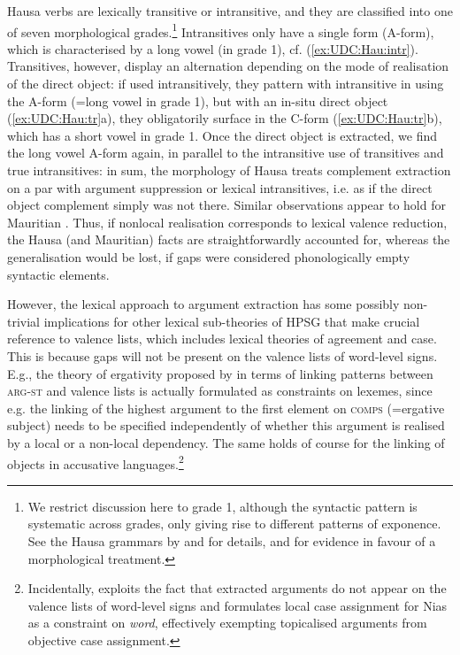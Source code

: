 \documentclass[output=paper
                ,modfonts
                ,nonflat
	        ,collection
	        ,collectionchapter
	        ,collectiontoclongg
 	        ,biblatex
                ,babelshorthands
                ,newtxmath
                ,draftmode
                ,colorlinks, citecolor=brown
]{./langsci/langscibook}
\begin{document}
{\begin{exe}
\end{exe}

\noindent
Hausa verbs are lexically transitive or intransitive, and they are
classified into one of seven morphological grades.\footnote{We
  restrict discussion here to grade 1, although the syntactic pattern
  is systematic across grades, only giving rise to different patterns
  of exponence. See the Hausa grammars by \citet{newman_p00} and
  \citet{jaggar01:_hausa} for details, and \citet{crysmann_b04yom} for
  evidence in favour of a morphological treatment. } Intransitives
only have a single form (A-form), which is characterised by a long
vowel (in grade 1), cf. (\ref{ex:UDC:Hau:intr}). Transitives, however,
display an alternation depending on the mode of realisation of the
direct object: if used intransitively, they pattern with intransitive
in using the A-form (=long vowel in grade 1), but with an in-situ
direct object (\ref{ex:UDC:Hau:tr}a), they obligatorily surface in the
C-form (\ref{ex:UDC:Hau:tr}b), which has a short vowel in grade
1. Once the direct object is extracted, we find the long vowel A-form
again, in parallel to the intransitive use of transitives and true
intransitives: in sum, the morphology of Hausa treats complement
extraction on a par with argument suppression or lexical
intransitives, i.e. as if the direct object complement simply was not
there. Similar observations appear to hold for Mauritian
\citep{Henri10}. Thus, if nonlocal realisation corresponds to lexical
valence reduction, the Hausa (and Mauritian) facts are
straightforwardly accounted for, whereas the generalisation would be
lost, if gaps were considered phonologically empty syntactic elements.


However, the lexical approach to argument extraction has some possibly
non-trivial implications for other lexical sub-theories of HPSG that
make crucial reference to valence lists, which includes lexical theories of
agreement and case. This is because gaps will not be present on the
valence lists of word-level signs. E.g., the theory of ergativity proposed by \citet{Manning:Sag:99} in terms of
linking patterns between \textsc{arg-st} and valence lists is
actually formulated as constraints on lexemes, since e.g. the linking
of the highest argument to the first element on \textsc{comps}
(=ergative subject) needs to be specified independently of whether
this argument is realised by a local or a non-local dependency. The
same holds of course for the linking of objects in accusative
languages.\footnote{Incidentally, \citet{Crysmann:09} exploits the
  fact that extracted arguments do not appear on the valence lists of
  word-level signs and formulates local case assignment for Nias as a
  constraint on \textit{word}, effectively exempting topicalised
  arguments from objective case assignment. }

}
\end{document}
